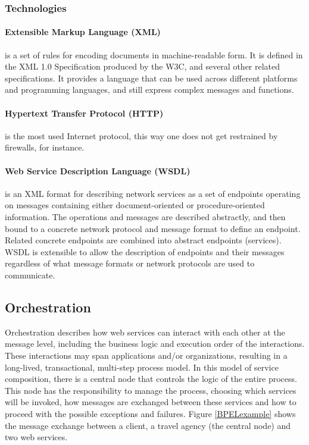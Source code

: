 \subsubsection{Technologies}

\paragraph{Extensible Markup Language (XML)}
is a set of rules for encoding documents in machine-readable form. It is defined in the XML 1.0 Specification produced by the W3C, and several other related specifications. It provides a language that can be used across different platforms and programming languages, and still express complex messages and functions.

\paragraph{Hypertext Transfer Protocol (HTTP)} 
is the most used Internet protocol, this way one does not get restrained by firewalls, for instance.

\paragraph{Web Service Description Language (WSDL)}
is an XML format for describing network services as a set of endpoints operating on messages containing either document-oriented or procedure-oriented information. The operations and messages are described abstractly, and then bound to a concrete network protocol and message format to define an endpoint. Related concrete endpoints are combined into abstract endpoints (services). WSDL is extensible to allow the description of endpoints and their messages regardless of what message formats or network protocols are used to communicate.

\subsection{Orchestration}
Orchestration describes how web services can interact with each other at the message level, including the business logic and execution order of the interactions. These interactions may span applications and/or organizations, resulting in a long-lived, transactional, multi-step process model. In this model of service composition, there is a central node that controls the logic of the entire process. This node has the responsibility to manage the process, choosing which services will be invoked, how messages are exchanged between these services and how to proceed with the possible exceptions and failures. Figure \ref{BPELexample} shows the message exchange between a client, a travel agency (the central node) and two web services.

